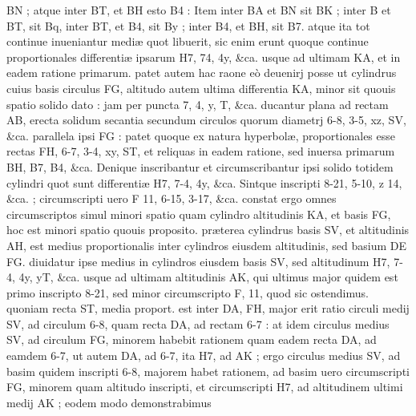 \documentclass[11pt,a4paper]{article}
\begin{document}

BN ; atque inter BT, et BH esto B4 : Item inter BA et BN sit BK ; inter B et BT, sit Bq, inter BT, et B4, sit By ; inter B4, et BH, sit B7. atque ita tot continue inueniantur mediæ quot libuerit, sic enim erunt quoque continue proportionales differentiæ ipsarum H7, 74, 4y, \&ca. usque ad ultimam KA, et in eadem ratione primarum. patet autem hac raone eò deuenirj posse ut cylindrus cuius basis circulus FG, altitudo autem ultima differentia KA, minor sit quouis spatio solido dato : jam per puncta 7, 4, y, T, \&ca. ducantur plana ad rectam AB, erecta solidum secantia secundum circulos quorum diametrj 6-8, 3-5, xz, SV, \&ca. parallela ipsi FG : patet quoque ex natura hyperbolæ, proportionales esse rectas FH, 6-7, 3-4, xy, ST, et reliquas in eadem ratione, sed inuersa primarum BH, B7, B4, \&ca. Denique inscribantur et circumscribantur ipsi solido totidem cylindri quot sunt differentiæ H7, 7-4, 4y, \&ca. Sintque inscripti 8-21, 5-10, z 14, \&ca. ; circumscripti uero F 11, 6-15, 3-17, \&ca. constat ergo omnes circumscriptos simul  minori spatio quam cylindro altitudinis KA, et basis FG, hoc est minori spatio quouis proposito. præterea cylindrus basis SV, et altitudinis AH, est medius proportionalis inter cylindros eiusdem altitudinis, sed basium DE FG. diuidatur ipse medius in cylindros eiusdem basis SV, sed altitudinum H7, 7-4, 4y, yT, \&ca. usque ad ultimam altitudinis AK, qui ultimus major quidem est primo inscripto 8-21, sed minor circumscripto F, 11, quod sic ostendimus. quoniam recta ST, media proport. est inter DA, FH, major erit ratio circuli medij SV, ad circulum 6-8, quam recta DA, ad rectam 6-7 : at idem circulus medius SV, ad circulum FG, minorem habebit rationem quam eadem recta DA, ad eamdem 6-7, ut autem DA, ad 6-7, ita H7, ad AK ; ergo circulus medius SV, ad basim quidem inscripti 6-8, majorem habet rationem, ad basim uero circumscripti FG, minorem quam altitudo  inscripti, et circumscripti H7, ad altitudinem ultimi medij AK ; eodem modo demonstrabimus
\end{document}

